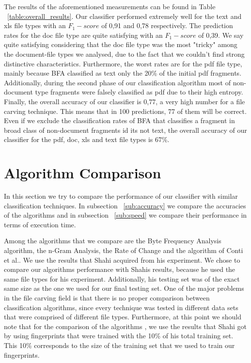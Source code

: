 The results of the aforementioned measurements can be found in Table ~\ref{table:overall_results}. Our classifier performed extremely well for the text and xls file types with an ${F_1}-score$ of 0,91 and 0,78 respectively. The prediction rates  for the doc file type are quite satisfying with an ${F_1}-score$  of 0,39. We say quite satisfying considering that the doc file type was the most "tricky" among the document-file types we analysed, due to the fact that we couldn't find strong distinctive characteristics. Furthermore, the worst rates are for the pdf file type, mainly because BFA classified as text only the 20\% of the initial pdf fragments. Additionally, during the second phase of our classification algorithm most of non-document type fragments were falsely classified as pdf due to their high entropy. Finally, the overall accuracy of our classifier is 0,77, a very high number for a file carving technique. This means that in 100 predictions, 77 of them will be correct. Even if we exclude the classification rates of BFA that classifies a fragment in broad class of non-document fragments id its not text, the overall accuracy of our classifier for the pdf, doc, xls and text file types is 67\%.


\section{Algorithm Comparison}
In this section we try to compare the performance of our classifier with similar classification techniques. In subsection ~\ref{sub:accuracy} we compare the accuracies of the algorithms and in subsection ~\ref{sub:speed} we compare their performance in terms of execution time.

Among the algorithms that we compare are the Byte Frequency Analysis algorithm\cite{MacDaniel}, the n-Gram Analysis\cite{ngram}, the Rate of Change\cite{roc} and the algorithm of Conti et al.\cite{Conti}. We use the results that Shahi acquired from his experiment\cite{Ashim}. We chose to compare our algorithms performance with Shahis results, because he used the same file types for his experiment. Additionally, his testing set was of the exact same size as the one we used for our final testing set. One of the major problems in the file carving field is that there is no proper comparison between classification algorithms, since every technique was tested in different data sets that were comprised of different file types. Furthermore, at this point we should note that for the comparison of the algorithms , we use the results that Shahi got by using fingerprints that were trained with the 10\% of his total training set. This 10\% corresponds to the size of the training set that we used to train our fingerprints.


